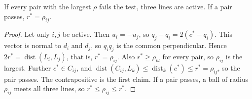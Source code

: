 \documentclass[10pt]{hackr26}
\newcommand{\dist}{\operatorname{dist}}
\begin{document}
\begin{lemma}[Dispatcher]\label{lem:disp}
If every pair with the largest $\rho$ fails the test, three lines are active.
If a pair passes, $r^*=\rho_{ij}$.
\end{lemma}
\begin{proof}
Let only $i,j$ be active. Then $u_i=-u_j$, so $q_j-q_i=2(c^*-q_i)$.
This vector is normal to $d_i$ and $d_j$, so $q_iq_j$ is the common perpendicular.
Hence $2r^*=\dist(L_i,L_j)$, that is, $r^*=\rho_{ij}$.
Also $r^*\ge\rho_{kl}$ for every pair, so $\rho_{ij}$ is the largest.
Further $c^*\in C_{ij}$, and $\dist(C_{ij},L_k)\le\dist_k(c^*)\le r^*=\rho_{ij}$, so the pair passes.
The contrapositive is the first claim.
If a pair passes, a ball of radius $\rho_{ij}$ meets all three lines, so $r^*\le\rho_{ij}\le r^*$.
\end{proof}
\end{document}
